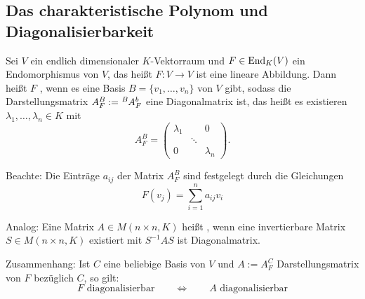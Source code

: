 \subsection{Das charakteristische Polynom und Diagonalisierbarkeit}
\label{sec:2.2}

Sei $V$ ein endlich dimensionaler $K$-Vektorraum und $F \in \operatorname{End}_K(V)$ ein Endomorphismus von $V$, das heißt $F\colon V \rightarrow V$ ist eine lineare Abbildung.
Dann heißt $F$ , wenn es eine Basis $B=\{v_1,\dots,v_n\}$ von $V$ gibt, sodass die Darstellungsmatrix $A_F^B := \mat{A}{B}{b}{F}$ eine Diagonalmatrix ist, das heißt es existieren $\lambda_1,\dots,\lambda_n \in K$ mit
\[
	A^B_F = \begin{pmatrix}
	\lambda_1 &  & 0 \\ 
	& \ddots &  \\ 
	0 &  & \lambda_n
	\end{pmatrix}.
\]

Beachte: Die Einträge $a_{ij}$ der Matrix $A_F^B$ sind festgelegt durch die Gleichungen
\begin{equation}
	F(v_j) = \sum_{i=1}^{n} a_{ij} v_i	\label{eq:darstellungsmatrix}
\end{equation}

Analog: Eine Matrix $A \in M(n\times n,K)$ heißt , wenn eine invertierbare Matrix $S \in M(n \times n,K)$ existiert mit $S^{-1}AS$ ist Diagonalmatrix.

Zusammenhang: Ist $C$ eine beliebige Basis von $V$ und $A := A_F^C$ Darstellungsmatrix von $F$ bezüglich $C$, so gilt:
\[
	F \text{ diagonalisierbar} \qquad \Leftrightarrow \qquad A \text{ diagonalisierbar}
\]

